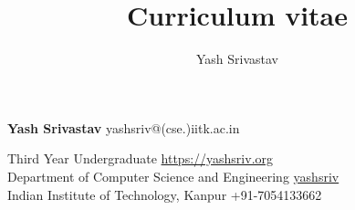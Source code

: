 \documentclass[10pt]{article}
\title{Curriculum vitae}
\author{Yash Srivastav}
\begin{document}

{\Huge\textbf{\sc Yash Srivastav}}
\hfill
yashsriv@(cse.)iitk.ac.in \faEnvelope


Third Year Undergraduate
\hfill
\href{https://yashsriv.org}{https://yashsriv.org \faHome}\\

Department of Computer Science and Engineering
\hfill
\href{https://github.com/yashsriv}{yashsriv \faGithub}\\

Indian Institute of Technology, Kanpur
\hfill
+91-7054133662 \faMobile \\

\begin{minipage}[t]{0.49\textwidth}
  \vspace{3mm}
  
  
  
\end{minipage}
\hfill
\begin{minipage}[t]{0.49\textwidth}
  \vspace{3mm}
  
  
  
  
\end{minipage}
\end{document}
